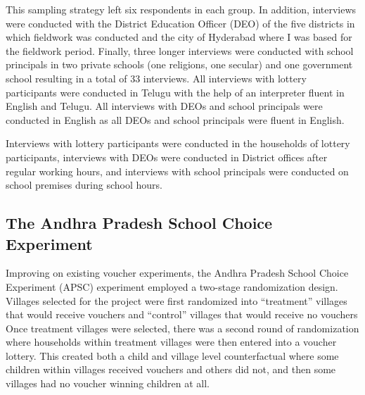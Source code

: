 \documentclass[hidelinks, 12pt, titlepage]{article}
\begin{document}
		This sampling strategy left six respondents in each group.  In addition, interviews were conducted with the District Education Officer (DEO) of the five districts in which fieldwork was conducted and the city of Hyderabad where I was based for the fieldwork period.  Finally, three longer interviews were conducted with school principals in two private schools (one religions, one secular) and one government school resulting in a total of 33 interviews.  All interviews with lottery participants were conducted in Telugu with the help of an interpreter fluent in English and Telugu.  All interviews with DEOs and school principals were conducted in English as all DEOs and school principals were fluent in English.

		Interviews with lottery participants were conducted in the households of lottery participants, interviews with DEOs were conducted in District offices after regular working hours, and interviews with school principals were conducted on school premises during school hours.

	\clearpage

	\subsection{The Andhra Pradesh School Choice Experiment\label{appendix:apsc}}

		Improving on existing voucher experiments, the Andhra Pradesh School Choice Experiment (APSC) experiment employed a two-stage randomization design.  Villages selected for the project were first randomized into ``treatment'' villages that would receive vouchers and ``control'' villages that would receive no vouchers Once treatment villages were selected, there was a second round of randomization where households within treatment villages were then entered into a voucher lottery.  This created both a child and village level counterfactual where some children within villages received vouchers and others did not, and then some villages had no voucher winning children at all.
\end{document}
